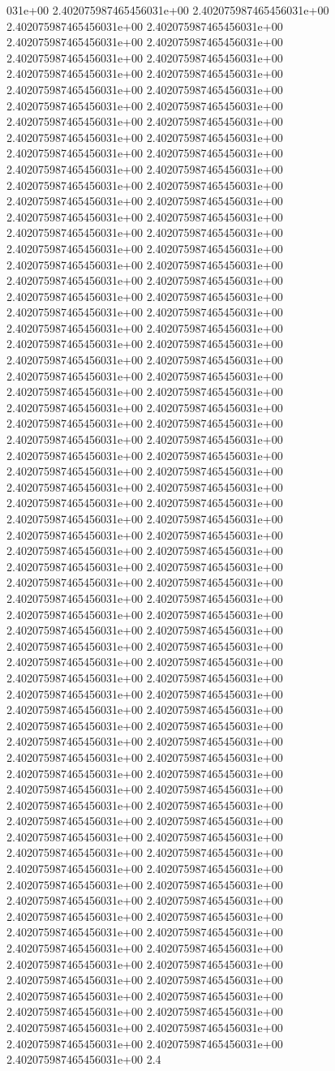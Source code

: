 031e+00	2.402075987465456031e+00	2.402075987465456031e+00	2.402075987465456031e+00	2.402075987465456031e+00	2.402075987465456031e+00	2.402075987465456031e+00	2.402075987465456031e+00	2.402075987465456031e+00	2.402075987465456031e+00	2.402075987465456031e+00	2.402075987465456031e+00	2.402075987465456031e+00	2.402075987465456031e+00	2.402075987465456031e+00	2.402075987465456031e+00	2.402075987465456031e+00	2.402075987465456031e+00	2.402075987465456031e+00	2.402075987465456031e+00	2.402075987465456031e+00	2.402075987465456031e+00	2.402075987465456031e+00	2.402075987465456031e+00	2.402075987465456031e+00	2.402075987465456031e+00	2.402075987465456031e+00	2.402075987465456031e+00	2.402075987465456031e+00	2.402075987465456031e+00	2.402075987465456031e+00	2.402075987465456031e+00	2.402075987465456031e+00	2.402075987465456031e+00	2.402075987465456031e+00	2.402075987465456031e+00	2.402075987465456031e+00	2.402075987465456031e+00	2.402075987465456031e+00	2.402075987465456031e+00	2.402075987465456031e+00	2.402075987465456031e+00	2.402075987465456031e+00	2.402075987465456031e+00	2.402075987465456031e+00	2.402075987465456031e+00	2.402075987465456031e+00	2.402075987465456031e+00	2.402075987465456031e+00	2.402075987465456031e+00	2.402075987465456031e+00	2.402075987465456031e+00	2.402075987465456031e+00	2.402075987465456031e+00	2.402075987465456031e+00	2.402075987465456031e+00	2.402075987465456031e+00	2.402075987465456031e+00	2.402075987465456031e+00	2.402075987465456031e+00	2.402075987465456031e+00	2.402075987465456031e+00	2.402075987465456031e+00	2.402075987465456031e+00	2.402075987465456031e+00	2.402075987465456031e+00	2.402075987465456031e+00	2.402075987465456031e+00	2.402075987465456031e+00	2.402075987465456031e+00	2.402075987465456031e+00	2.402075987465456031e+00	2.402075987465456031e+00	2.402075987465456031e+00	2.402075987465456031e+00	2.402075987465456031e+00	2.402075987465456031e+00	2.402075987465456031e+00	2.402075987465456031e+00	2.402075987465456031e+00	2.402075987465456031e+00	2.402075987465456031e+00	2.402075987465456031e+00	2.402075987465456031e+00	2.402075987465456031e+00	2.402075987465456031e+00	2.402075987465456031e+00	2.402075987465456031e+00	2.402075987465456031e+00	2.402075987465456031e+00	2.402075987465456031e+00	2.402075987465456031e+00	2.402075987465456031e+00	2.402075987465456031e+00	2.402075987465456031e+00	2.402075987465456031e+00	2.402075987465456031e+00	2.402075987465456031e+00	2.402075987465456031e+00	2.402075987465456031e+00	2.402075987465456031e+00	2.402075987465456031e+00	2.402075987465456031e+00	2.402075987465456031e+00	2.402075987465456031e+00	2.402075987465456031e+00	2.402075987465456031e+00	2.402075987465456031e+00	2.402075987465456031e+00	2.402075987465456031e+00	2.402075987465456031e+00	2.402075987465456031e+00	2.402075987465456031e+00	2.402075987465456031e+00	2.402075987465456031e+00	2.402075987465456031e+00	2.402075987465456031e+00	2.402075987465456031e+00	2.402075987465456031e+00	2.402075987465456031e+00	2.402075987465456031e+00	2.402075987465456031e+00	2.402075987465456031e+00	2.402075987465456031e+00	2.402075987465456031e+00	2.402075987465456031e+00	2.402075987465456031e+00	2.402075987465456031e+00	2.402075987465456031e+00	2.402075987465456031e+00	2.402075987465456031e+00	2.402075987465456031e+00	2.402075987465456031e+00	2.402075987465456031e+00	2.4
